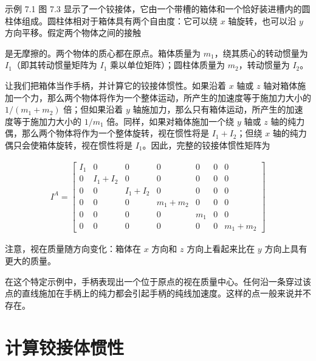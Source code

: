 \documentclass[10pt,a4paper]{book}
\theoremstyle{thmstyle} %
\theoremstyle{defstyle} %
\theoremstyle{prostyle} %
\begin{document}
示例 7.1 图 7.3 显示了一个铰接体，它由一个带槽的箱体和一个恰好装进槽内的圆柱体组成。圆柱体相对于箱体具有两个自由度：它可以绕 $x$ 轴旋转，也可以沿 $y$ 方向平移。假定两个物体之间的接触



是无摩擦的。两个物体的质心都在原点。箱体质量为 $m_{1}$，绕其质心的转动惯量为 $I_{1}$（即其转动惯量矩阵为 $I_{1}$ 乘以单位矩阵）；圆柱体质量为 $m_{2}$，转动惯量为 $I_{2}$。



让我们把箱体当作手柄，并计算它的铰接体惯性。如果沿着 $x$ 轴或 $z$ 轴对箱体施加一个力，那么两个物体将作为一个整体运动，所产生的加速度等于施加力大小的 $1/(m_{1}+m_{2})$ 倍；但如果沿着 $y$ 轴施加力，那么只有箱体运动，所产生的加速度等于施加力大小的 $1/m_{1}$ 倍。同样，如果对箱体施加一个绕 $y$ 轴或 $z$ 轴的纯力偶，那么两个物体将作为一个整体旋转，视在惯性将是 $I_{1}+I_{2}$；但绕 $x$ 轴的纯力偶只会使箱体旋转，视在惯性将是 $I_{1}$。因此，完整的铰接体惯性矩阵为



$$
\begin{array}{r} { I ^{A} = \left[ \begin{array}{lllllll} { I _ { 1 } } & { 0 } & { 0 } & { 0 } & { 0 } & { 0 } & { 0 } \\{ 0 } & { I _ { 1 } + I _ { 2 } } & { 0 } & { 0 } & { 0 } & { 0 } & { 0 } \\{ 0 } & { 0 } & { I _ { 1 } + I _ { 2 } } & { 0 } & { 0 } & { 0 } & { 0 } \\{ 0 } & { 0 } & { 0 } & { m _ { 1 } + m _ { 2 } } & { 0 } & { 0 } & { 0 } \\{ 0 } & { 0 } & { 0 } & { 0 } & { m _ { 1 } } & { 0 } & { 0 } \\{ 0 } & { 0 } & { 0 } & { 0 } & { 0 } & { 0 } & { m _ { 1 } + m _ { 2 } } \end{array} \right] } \end{array}
$$



注意，视在质量随方向变化：箱体在 $x$ 方向和 $z$ 方向上看起来比在 $y$ 方向上具有更大的质量。



在这个特定示例中，手柄表现出一个位于原点的视在质量中心。任何沿一条穿过该点的直线施加在手柄上的纯力都会引起手柄的纯线加速度。这样的点一般来说并不存在。



\section{计算铰接体惯性}
\end{document}
